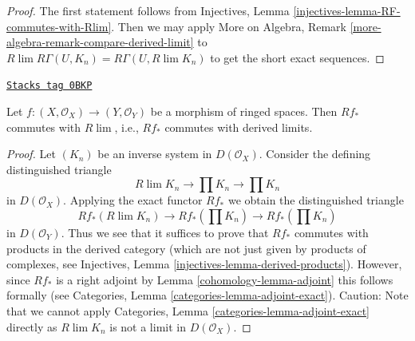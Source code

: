 \begin{proof}
The first statement follows from
Injectives, Lemma \ref{injectives-lemma-RF-commutes-with-Rlim}.
Then we may apply
More on Algebra, Remark \ref{more-algebra-remark-compare-derived-limit}
to $R\lim R\Gamma(U, K_n) = R\Gamma(U, R\lim K_n)$ to get the short
exact sequences.
\end{proof}

\begin{lemma}
\label{cohomology-lemma-Rf-commutes-with-Rlim}
\href{https://stacks.math.columbia.edu/tag/0BKP}{\texttt{Stacks tag 0BKP}}

Let $f : (X, \mathcal{O}_X) \to (Y, \mathcal{O}_Y)$ be a morphism of ringed
spaces. Then $Rf_*$ commutes with $R\lim$, i.e., $Rf_*$ commutes with
derived limits.
\end{lemma}

\begin{proof}

Let $(K_n)$ be an inverse system in $D(\mathcal{O}_X)$. Consider the defining
distinguished triangle
$$
R\lim K_n \to \prod K_n \to \prod K_n
$$
in $D(\mathcal{O}_X)$. Applying the exact functor $Rf_*$ we obtain
the distinguished triangle
$$
Rf_*(R\lim K_n) \to Rf_*\left(\prod K_n\right) \to Rf_*\left(\prod K_n\right)
$$
in $D(\mathcal{O}_Y)$. Thus we see that it suffices to prove that
$Rf_*$ commutes with products in the derived category (which are not just
given by products of complexes, see
Injectives, Lemma \ref{injectives-lemma-derived-products}).
However, since $Rf_*$ is a right adjoint by Lemma \ref{cohomology-lemma-adjoint}
this follows formally (see
Categories, Lemma \ref{categories-lemma-adjoint-exact}).
Caution: Note that we cannot apply
Categories, Lemma \ref{categories-lemma-adjoint-exact}
directly as $R\lim K_n$ is not a limit in $D(\mathcal{O}_X)$.
\end{proof}


